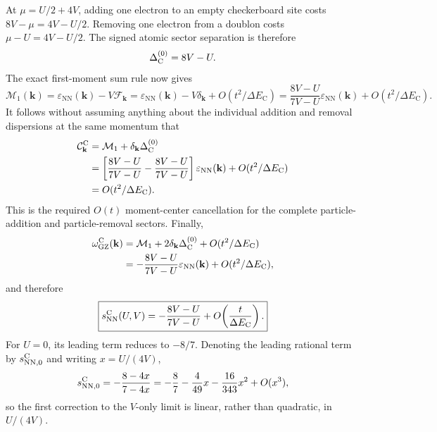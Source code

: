 \documentclass[10pt]{article}
\newcommand{\epsk}{\varepsilon_{\mathrm{NN}}(\mathbf{k})}
\newcommand{\wzero}{\omega_{\mathrm{GZ}}}
\newcommand{\dk}{\delta_{\mathbf{k}}}
\begin{document}
At $\mu=U/2+4V$, adding one electron to an empty checkerboard site costs
$8V-\mu=4V-U/2$. Removing one electron from a doublon costs
$\mu-U=4V-U/2$. The signed atomic sector separation is therefore
\begin{equation}
 \Delta_{\rm C}^{(0)}=8V-U .
 \label{eq:s-cdw-separation-uv}
\end{equation}
The exact first-moment sum rule now gives
\begin{equation}
 \mathcal M_1(\mathbf k)
 =\epsk-V\mathcal F_{\mathbf k}
 =\epsk-V\dk+O(t^2/\Delta E_{\mathrm C})
 =\frac{8V-U}{7V-U}\epsk+O(t^2/\Delta E_{\mathrm C}).
 \label{eq:s-cdw-m1-uv}
\end{equation}
It follows without assuming anything about the individual addition and
removal dispersions at the same momentum that
\begin{align}
 \mathcal C_{\mathbf k}^{\rm C}
 &=\mathcal M_1+\dk\Delta_{\rm C}^{(0)}\nonumber\\
 &=\left[\frac{8V-U}{7V-U}-\frac{8V-U}{7V-U}\right]\epsk
 +O(t^2/\Delta E_{\mathrm C})\nonumber\\
 &=O(t^2/\Delta E_{\mathrm C}).
 \label{eq:s-cdw-center-exact-uv}
\end{align}
This is the required $O(t)$ moment-center cancellation for the complete
particle-addition and particle-removal sectors. Finally,
\begin{align}
 \wzero^{\rm C}(\mathbf k)
 &=\mathcal M_1+2\dk\Delta_{\rm C}^{(0)}+O(t^2/\Delta E_{\mathrm C})\nonumber\\
 &=-\frac{8V-U}{7V-U}\epsk+O(t^2/\Delta E_{\mathrm C}),
 \label{eq:s-cdw-result-uv}
\end{align}
and therefore
\begin{equation}
 \boxed{s_{\mathrm{NN}}^{\rm C}(U,V)
 =-\frac{8V-U}{7V-U}
 +O\!\left(\frac{t}{\Delta E_{\mathrm C}}\right).}
 \label{eq:s-cdw-scale-uv}
\end{equation}
For $U=0$, its leading term reduces to $-8/7$. Denoting the leading rational
term by $s_{\mathrm{NN},0}^{\rm C}$ and writing $x=U/(4V)$,
\begin{equation}
 s_{\mathrm{NN},0}^{\rm C}
 =-\frac{8-4x}{7-4x}
 =-\frac87-\frac{4}{49}x-\frac{16}{343}x^2+O(x^3),
 \label{eq:s-cdw-expansion-uv}
\end{equation}
so the first correction to the $V$-only limit is linear, rather than
quadratic, in $U/(4V)$.
\end{document}

